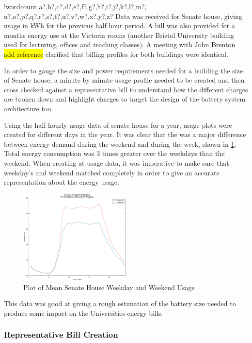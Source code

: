 \documentclass[fontsize=9.5pt]{extarticle}
\numberwithin{figure}{section} %
\newcounter{words}
\newenvironment{counted}{%
  \setcounter{words}{0}
  \SearchList!{wordcount}{\stepcounter{words}}
    {a?,b?,c?,d?,e?,f?,g?,h?,i?,j?,k?,l?,m?,
    n?,o?,p?,q?,r?,s?,t?,u?,v?,w?,x?,y?,z?}
  \UndoBoundary{'}
  \SearchOrder{p;}}{%
  \StopSearching}
\begin{document}
\begin{counted}
Data was received for Senate house, giving usage in kWh for the previous
half hour period. A bill was also provided for a months energy use at
the Victoria rooms (another Bristol University building used for
lecturing, offices and teaching classes). A meeting with John Brenton
\hl{add reference} clarified that billing profiles for both buildings
were identical.

In order to gauge the size and power requirements needed for a building
the size of Senate house, a minute by minute usage profile needed to be
created and then cross checked against a representative bill to
understand how the different charges are broken down and highlight
charges to target the design of the battery system architecture too.

Using the half hourly usage data of senate house for a year, usage plots
were created for different days in the year. It was clear that the was a
major difference between energy demand during the weekend and during the
week, shown in \ref{Development-c4}. Total energy consumption was 3
times greater over the weekdays than the weekend. When creating at usage
data, it was imperative to make sure that weekday's and weekend matched
completely in order to give an accurate representation about the energy
usage.\\

\begin{figure}[H]
 \centering
 \includegraphics[trim = 50 50 30 50, clip, width=0.5\textwidth]{Development-c4.eps}
 \caption{Plot of Mean Senate House Weekday and Weekend Usage}
 \label{Development-c4}
 \end{figure}

This data was good at giving a rough estimation of the battery size
needed to produce some impact on the Universities energy bills.

\subsubsection{Representative Bill
Creation}\label{representative-bill-creation}


\end{counted}
\end{document}
